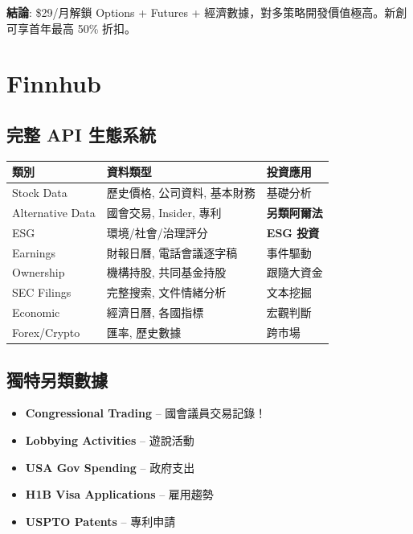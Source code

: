 \documentclass[11pt,a4paper]{article}
\begin{document}
\begin{tcolorbox}[colback=polygonpurple!5,colframe=polygonpurple]
\textbf{結論}: \$29/月解鎖 Options + Futures + 經濟數據，對多策略開發價值極高。新創可享首年最高 50\% 折扣。
\end{tcolorbox}

\newpage
\section{Finnhub}

\subsection{完整 API 生態系統}

\begin{table}[H]
\centering
\begin{tabular}{@{}lll@{}}
\toprule
\textbf{類別} & \textbf{資料類型} & \textbf{投資應用} \\
\midrule
Stock Data & 歷史價格, 公司資料, 基本財務 & 基礎分析 \\
Alternative Data & 國會交易, Insider, 專利 & \textbf{另類阿爾法} \\
ESG & 環境/社會/治理評分 & \textbf{ESG 投資} \\
Earnings & 財報日曆, 電話會議逐字稿 & 事件驅動 \\
Ownership & 機構持股, 共同基金持股 & 跟隨大資金 \\
SEC Filings & 完整搜索, 文件情緒分析 & 文本挖掘 \\
Economic & 經濟日曆, 各國指標 & 宏觀判斷 \\
Forex/Crypto & 匯率, 歷史數據 & 跨市場 \\
\bottomrule
\end{tabular}
\end{table}

\subsection{獨特另類數據}

\begin{tcolorbox}[colback=finnhubgreen!5,colframe=finnhubgreen,title={Alternative Data (極其獨特)}]
\begin{itemize}[leftmargin=*]
    \item \textbf{Congressional Trading} -- 國會議員交易記錄！
    \item \textbf{Lobbying Activities} -- 遊說活動
    \item \textbf{USA Gov Spending} -- 政府支出
    \item \textbf{H1B Visa Applications} -- 雇用趨勢
    \item \textbf{USPTO Patents} -- 專利申請
\end{itemize}
\end{tcolorbox}
\end{document}
